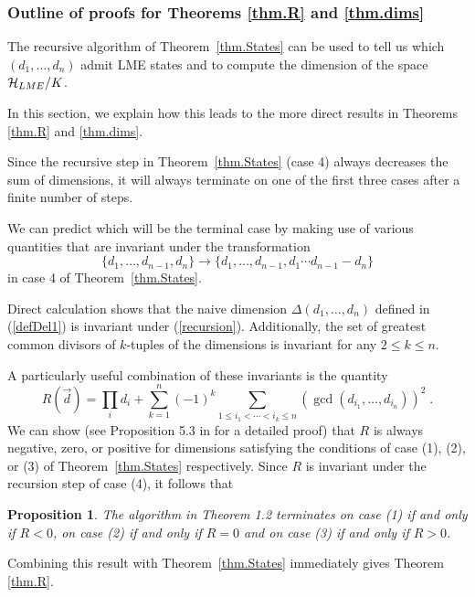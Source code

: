 \documentclass[12pt]{article}
\newtheorem{proposition}[theorem]{Proposition}
\theoremstyle{definition}
\newcommand{\be}{\begin{equation}}
\newcommand{\ee}{\end{equation}}
\begin{document}
\subsubsection*{Outline of proofs for Theorems \ref{thm.R} and \ref{thm.dims}}

The recursive algorithm of Theorem~\ref{thm.States} can be used to tell us which $(d_1, \dots, d_n)$ admit LME states and to
compute the dimension of the space ${\cal H}_{LME}/K$.

In this section, we explain how this leads to the more direct results in Theorems \ref{thm.R} and \ref{thm.dims}.

Since the recursive step in Theorem~\ref{thm.States} (case 4) always decreases the sum of dimensions, it will always terminate on one of the first three cases after a finite number of steps.

We can predict which will be the terminal case by making use of various quantities that are invariant under the transformation
\be
\label{recursion}
\{d_1,\dots,d_{n-1}, d_n\} \rightarrow \{d_1,\dots,d_{n-1}, d_1 \cdots d_{n-1} - d_n\}
\ee
in case 4 of Theorem~\ref{thm.States}.

Direct calculation shows that the naive dimension  $\Delta(d_1, \dots, d_n)$ defined in (\ref{defDel1}) is invariant under (\ref{recursion}). Additionally, the set of greatest common divisors of $k$-tuples of the dimensions is invariant for any $2 \le k \le n$.

A particularly useful combination of these invariants is the quantity
\be
R(\vec{d}) = \prod_i d_i + \sum_{k=1}^n (-1)^k \sum_{1 \le i_1 < \cdots < i_k \le n} (\gcd(d_{i_1},\dots,d_{i_n}))^2 \; .
\ee
We can show (see Proposition 5.3 in \cite{mathpaper} for a detailed proof) that $R$ is always negative, zero, or positive for dimensions satisfying the conditions of case (1), (2), or (3) of Theorem~\ref{thm.States} respectively. Since $R$ is invariant under the recursion step of case (4), it follows that
\begin{proposition}\label{prop:Rcases}
The algorithm in Theorem 1.2 terminates on case (1) if and only if $R<0$, on case (2) if and only if $R=0$ and on case (3) if and only if $R>0$.
\end{proposition}
Combining this result with Theorem~\ref{thm.States} immediately gives Theorem \ref{thm.R}.
\end{document}
